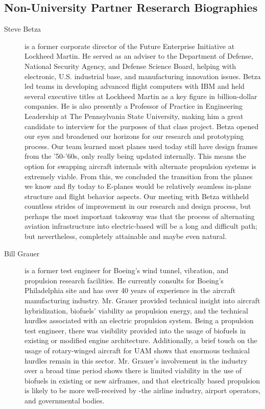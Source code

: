 \documentclass[../main.tex]{subfiles}
\begin{document}
\begin{appendices}
\begin{singlespace}
\section{Non-University Partner Reserarch Biographies}\label{apxC}
\begin{description}
    \item [Steve Betza] is a former corporate director of the Future Enterprise Initiative at Lockheed Martin. He served as an adviser to the Department of Defense, National Security Agency, and Defense Science Board, helping with electronic, U.S. industrial base, and manufacturing innovation issues. Betza led teams in developing advanced flight computers with IBM and held several executive titles at Lockheed Martin as a key figure in billion-dollar companies. He is also presently a Professor of Practice in Engineering Leadership at The Pennsylvania State University, making him a great candidate to interview for the purposes of that class project. Betza opened our eyes and broadened our horizons for our research and prototyping process. Our team learned most planes used today still have design frames from the '50-'60s, only really being updated internally. This means the option for swapping aircraft internals with alternate propulsion systems is extremely viable. From this, we concluded the transition from the planes we know and fly today to E-planes would be relatively seamless in-plane structure and flight behavior aspects. Our meeting with Betza withheld countless strides of improvement in our research and design process, but perhaps the most important takeaway was that the process of alternating aviation infrastructure into electric-based will be a long and difficult path; but nevertheless, completely attainable and maybe even natural.
    
    \item [Bill Grauer] is a former test engineer for Boeing's wind tunnel, vibration, and propulsion research facilities. He currently consults for Boeing's Philadelphia site and has over 40 years of experience in the aircraft manufacturing industry. Mr. Grauer provided technical insight into aircraft hybridization, biofuels' viability as propulsion energy, and the technical hurdles associated with an electric propulsion system. Being a propulsion test engineer, there was visibility provided into the usage of biofuels in existing or modified engine architecture. Additionally, a brief touch on the usage of rotary-winged aircraft for UAM shows that enormous technical hurdles remain in this sector. Mr. Grauer's involvement in the industry over a broad time period shows there is limited viability in the use of biofuels in existing or new airframes, and that electrically based propulsion is likely to be more well-received by -the airline industry, airport operators, and governmental bodies.
\end{description}


\end{singlespace}
\end{appendices}
\end{document}
